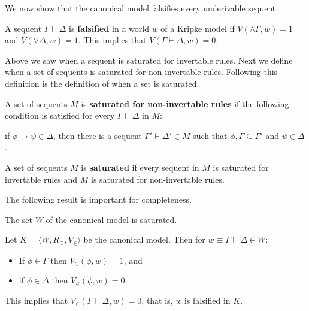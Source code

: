 \documentclass{article}
\begin{document}
We now show that the canonical model falsifies every underivable sequent. 
\begin{definition}
  \label{def:Falsification}
  A sequent $\Gamma \vdash \Delta$ is \textbf{falsified} in a world $w$ of a Kripke model if
  $V(\land \Gamma,w) = 1$ and $V(\lor \Delta, w) = 1$.  This implies that $V(\Gamma \vdash \Delta, w) = 0$.
\end{definition}

Above we saw when a sequent is saturated for invertable rules.  Next we define when a set of sequents 
is saturated for non-invertable rules. Following this definition is the definition of when a set is
saturated.
\begin{definition}
  \label{def:sat_non-invert_rules}
  A set of sequents $M$ is \textbf{saturated for non-invertable rules} if the
  following condition is satisfied for every $\Gamma \vdash \Delta$
  in $M$:
  \begin{center}
    if $\phi \to \psi \in \Delta$, then there is a sequent $\Gamma' \vdash \Delta' \in M$ such that
    $\phi,\Gamma \subseteq \Gamma'$ and $\psi \in \Delta$.
  \end{center}
\end{definition}

\begin{definition}
  \label{def:sat_set}
  A set of sequents $M$ is \textbf{saturated} if every sequent in $M$ is saturated for invertable rules
  and $M$ is saturated for non-invertable rules.
\end{definition}

The following result is important for completeness.

\begin{lemma}
  \label{lemma:canonical_model_is_saturated}
  The set $W$ of the canonical model is saturated.
\end{lemma}

\begin{thm}[Falsification in $K$]
  \label{thm:falsification_in_k}
  Let $K = \langle W, R_\subseteq, V_\in \rangle$ be the canonical model. Then for $w \equiv \Gamma \vdash \Delta \in W$:
  \begin{center}
    \begin{itemize}
    \item[] If $\phi \in \Gamma$ then $V_\in(\phi, w) = 1$, and
    \item[] if $\phi \in \Delta$ then $V_\in(\phi,w) = 0$.
    \end{itemize}
  \end{center}
  This implies that $V_\in(\Gamma \vdash \Delta, w) = 0$, that is, $w$ is falsified in $K$.
\end{thm}
\end{document}

